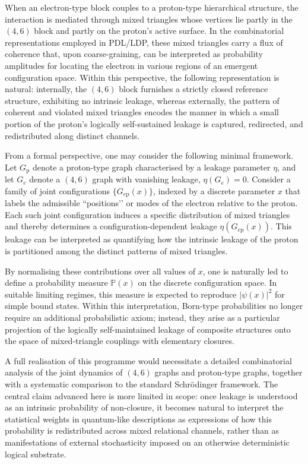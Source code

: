 \documentclass[11pt,a4paper]{article}
\theoremstyle{definition}
\newcommand{\etaL}{\eta} %
\newcommand{\Prob}{\mathbb{P}}
\begin{document}
When an electron-type block couples to a proton-type hierarchical structure, the interaction is mediated through mixed triangles whose vertices lie partly in the \((4,6)\) block and partly on the proton’s active surface. In the combinatorial representations employed in PDL/LDP, these mixed triangles carry a flux of coherence that, upon coarse-graining, can be interpreted as probability amplitudes for locating the electron in various regions of an emergent configuration space. Within this perspective, the following representation is natural: internally, the \((4,6)\) block furnishes a strictly closed reference structure, exhibiting no intrinsic leakage, whereas externally, the pattern of coherent and violated mixed triangles encodes the manner in which a small portion of the proton’s logically self-sustained leakage is captured, redirected, and redistributed along distinct channels.

From a formal perspective, one may consider the following minimal framework. Let \(G_{\mathrm{p}}\) denote a proton-type graph characterised by a leakage parameter \(\etaL\), and let \(G_{e}\) denote a \((4,6)\) graph with vanishing leakage, \(\eta(G_{e}) = 0\). Consider a family of joint configurations \(\{G_{e\mathrm{p}}(x)\}\), indexed by a discrete parameter \(x\) that labels the admissible “positions’’ or modes of the electron relative to the proton. Each such joint configuration induces a specific distribution of mixed triangles and thereby determines a configuration-dependent leakage \(\eta(G_{e\mathrm{p}}(x))\). This leakage can be interpreted as quantifying how the intrinsic leakage of the proton is partitioned among the distinct patterns of mixed triangles.

By normalising these contributions over all values of \(x\), one is naturally led to define a probability measure \(\Prob(x)\) on the discrete configuration space. In suitable limiting regimes, this measure is expected to reproduce \(|\psi(x)|^2\) for simple bound states. Within this interpretation, Born-type probabilities no longer require an additional probabilistic axiom; instead, they arise as a particular projection of the logically self-maintained leakage of composite structures onto the space of mixed-triangle couplings with elementary closures.

A full realisation of this programme would necessitate a detailed combinatorial analysis of the joint dynamics of \((4,6)\) graphs and proton-type graphs, together with a systematic comparison to the standard Schrödinger framework. The central claim advanced here is more limited in scope: once leakage is understood as an intrinsic probability of non-closure, it becomes natural to interpret the statistical weights in quantum-like descriptions as expressions of how this probability is redistributed across mixed relational channels, rather than as manifestations of external stochasticity imposed on an otherwise deterministic logical substrate.
\end{document}
